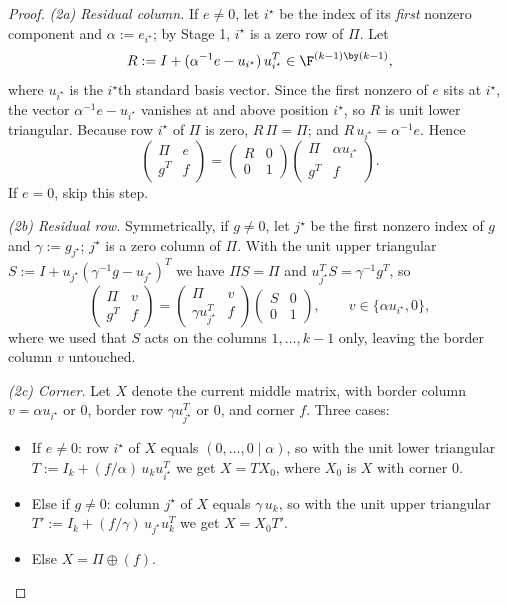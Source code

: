 \begin{proof}
  \emph{(2a) Residual column.}
  If $e \neq 0$, let $i^\star$ be the index of its \emph{first} nonzero
  component and $\alpha := e_{i^\star}$; by Stage 1, $i^\star$ is a zero row
  of $\Pi$.  Let
  \[
    R := I + (\alpha^{-1} e - u_{i^\star}) \, u_{i^\star}^T \in
    \F^{(k-1) \by (k-1)},
  \]
  where $u_{i^\star}$ is the $i^\star$th standard basis vector.  Since the
  first nonzero of $e$ sits at $i^\star$, the vector
  $\alpha^{-1}e - u_{i^\star}$ vanishes at and above position $i^\star$, so
  $R$ is unit lower triangular.  Because row $i^\star$ of $\Pi$ is zero,
  $R \, \Pi = \Pi$; and $R \, u_{i^\star} = \alpha^{-1} e$.  Hence
  \[
    \begin{pmatrix}
      \Pi & e\\
      g^T & f
    \end{pmatrix}
    =
    \begin{pmatrix}
      R & 0\\
      0 & 1
    \end{pmatrix}
    \begin{pmatrix}
      \Pi & \alpha u_{i^\star}\\
      g^T & f
    \end{pmatrix}.
  \]
  If $e = 0$, skip this step.

  \emph{(2b) Residual row.}
  Symmetrically, if $g \neq 0$, let $j^\star$ be the first nonzero index of
  $g$ and $\gamma := g_{j^\star}$; $j^\star$ is a zero column of $\Pi$.  With
  the unit upper triangular
  $S := I + u_{j^\star} (\gamma^{-1} g - u_{j^\star})^T$ we have
  $\Pi S = \Pi$ and $u_{j^\star}^T S = \gamma^{-1} g^T$, so
  \[
    \begin{pmatrix}
      \Pi & v\\
      g^T & f
    \end{pmatrix}
    =
    \begin{pmatrix}
      \Pi & v\\
      \gamma u_{j^\star}^T & f
    \end{pmatrix}
    \begin{pmatrix}
      S & 0\\
      0 & 1
    \end{pmatrix},
    \qquad v \in \{\alpha u_{i^\star}, 0\},
  \]
  where we used that $S$ acts on the columns $1, \ldots, k-1$ only, leaving
  the border column $v$ untouched.

  \emph{(2c) Corner.}
  Let $X$ denote the current middle matrix, with border column
  $v = \alpha u_{i^\star}$ or $0$, border row $\gamma u_{j^\star}^T$ or $0$,
  and corner $f$.  Three cases:
  \begin{itemize}
    \item If $e \neq 0$: row $i^\star$ of $X$ equals $(0, \ldots, 0 \mid
      \alpha)$, so with the unit lower triangular
      $T := I_k + (f/\alpha) \, u_k u_{i^\star}^T$ we get $X = T X_0$, where
      $X_0$ is $X$ with corner $0$.
    \item Else if $g \neq 0$: column $j^\star$ of $X$ equals
      $\gamma \, u_k$, so with the unit upper triangular
      $T' := I_k + (f/\gamma) \, u_{j^\star} u_k^T$ we get $X = X_0 T'$.
    \item Else $X = \Pi \oplus (f)$.
  \end{itemize}


\end{proof}
